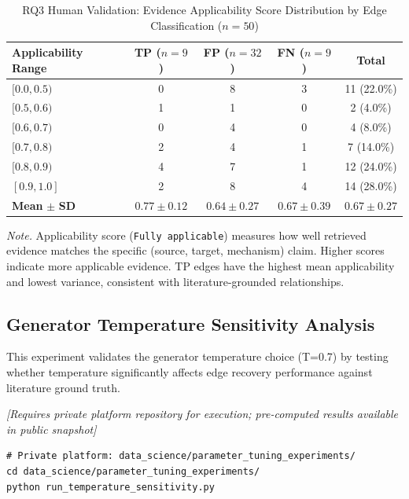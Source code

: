 \begin{table}[H]
\centering
\caption{RQ3 Human Validation: Evidence Applicability Score Distribution by Edge Classification ($n=50$)}
\label{tab:rq3_applicability_distribution}
\begin{threeparttable}
\begin{tabular}{lcccc}
\toprule
\textbf{Applicability Range} & \textbf{TP} ($n=9$) & \textbf{FP} ($n=32$) & \textbf{FN} ($n=9$) & \textbf{Total} \\
\midrule
$[0.0, 0.5)$ & 0 & 8 & 3 & 11 (22.0\%) \\
$[0.5, 0.6)$ & 1 & 1 & 0 & 2 (4.0\%) \\
$[0.6, 0.7)$ & 0 & 4 & 0 & 4 (8.0\%) \\
$[0.7, 0.8)$ & 2 & 4 & 1 & 7 (14.0\%) \\
$[0.8, 0.9)$ & 4 & 7 & 1 & 12 (24.0\%) \\
$[0.9, 1.0]$ & 2 & 8 & 4 & 14 (28.0\%) \\
\midrule
\textbf{Mean} $\pm$ \textbf{SD} & $0.77 \pm 0.12$ & $0.64 \pm 0.27$ & $0.67 \pm 0.39$ & $0.67 \pm 0.27$ \\
\bottomrule
\end{tabular}
\begin{tablenotes}
\small
\item \textit{Note.} Applicability score (\texttt{Fully applicable}) measures how well retrieved evidence matches the specific (source, target, mechanism) claim. Higher scores indicate more applicable evidence. TP edges have the highest mean applicability and lowest variance, consistent with literature-grounded relationships.
\end{tablenotes}
\end{threeparttable}
\end{table}

\subsection{Generator Temperature Sensitivity Analysis}
\label{sec:temp_sensitivity_execution}

This experiment validates the generator temperature choice (T=0.7) by testing whether temperature significantly affects edge recovery performance against literature ground truth.

\noindent\textit{[Requires private platform repository for execution; pre-computed results available in public snapshot]}

\begin{verbatim}
# Private platform: data_science/parameter_tuning_experiments/
cd data_science/parameter_tuning_experiments/
python run_temperature_sensitivity.py
\end{verbatim}

